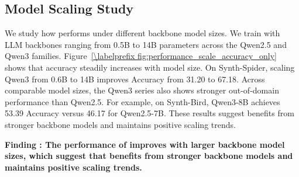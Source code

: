 \subsection{Model Scaling Study}
\label{subsec:scalability}



We study how \sys performs under different backbone model sizes. We train \sys with LLM backbones ranging from 0.5B to 14B parameters across the Qwen2.5 and Qwen3 families.
Figure~\ref{\labelprefix fig:performance_scale_accuracy_only} shows that accuracy steadily increases with model size. On Synth-Spider, scaling Qwen3 from 0.6B to 14B improves Accuracy from 31.20 to 67.18. Across comparable model sizes, the Qwen3 series also shows stronger out-of-domain performance than Qwen2.5. For example, on Synth-Bird, Qwen3-8B achieves 53.39 Accuracy versus 46.17 for Qwen2.5-7B. These results suggest \sys benefits from stronger backbone models and maintains positive scaling trends.


\begin{shaded}
\noindent
\textbf{Finding \findingnum: The performance of \sys improves with larger backbone model sizes, which suggest that \sys benefits from stronger backbone models and maintains positive scaling trends.}
\end{shaded}